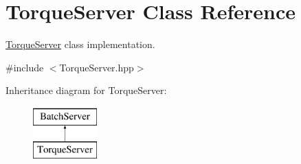 \hypertarget{classTorqueServer}{
\section{TorqueServer Class Reference}
\label{classTorqueServer}
}


\hyperlink{classTorqueServer}{TorqueServer} class implementation.  




{\ttfamily \#include $<$TorqueServer.hpp$>$}

Inheritance diagram for TorqueServer:\begin{figure}[H]
\begin{center}
\leavevmode
\includegraphics[height=2.000000cm]{classTorqueServer}
\end{center}
\end{figure}
